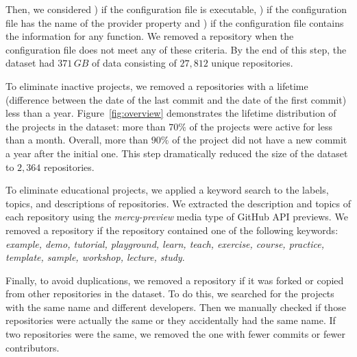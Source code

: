 Then, 
we considered ) if the configuration file is executable, ) if 
the configuration file has the name of the provider property and 
) if the configuration file contains the information for any 
function. We removed a repository when the configuration file
does not meet any of these criteria. 
%
By the end of this step, the dataset had $371 \, GB$ of data consisting 
of $27,812$ unique repositories. 

To eliminate inactive projects, we removed a repositories with a lifetime 
(difference between the date of the last commit and the date of the first commit)
less than a year. 
Figure~\ref{fig:overview} demonstrates the lifetime distribution of the 
projects in the dataset: more than $70\%$ of the projects 
were active for less than a month. Overall, more than $90\%$ 
of the project did not have a new commit a year after the initial one. 
This step dramatically reduced the size of the dataset to $2,364$ 
repositories.

To eliminate educational projects, 
we applied a keyword search to the labels, topics, and 
descriptions of repositories. We extracted the description 
and topics of each repository using the \emph{mercy-preview} media 
type of GitHub API previews. We removed a repository 
if the repository contained one of the following keywords: 
\emph{example, demo, tutorial, playground, learn, teach, exercise, 
	course, practice, template, sample, workshop, lecture, study}.

Finally, to avoid duplications, we removed a repository if it was forked 
or copied from other repositories in the dataset. To do this, we 
searched for the projects with the same name and different developers. 
Then we manually checked if those repositories were actually the same or 
they accidentally had the same name. If two repositories were the same, 
we removed the one with fewer commits or fewer contributors.





